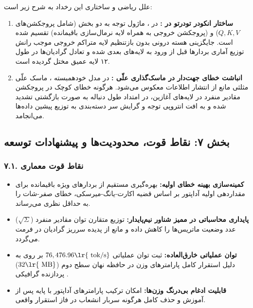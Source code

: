 علل ریاضی و ساختاری این رخداد به شرح زیر است:
\begin{enumerate}
    \item \textbf{ساختار انکودر تودرتو در :} در ، ماژول توجه به دو بخش  (شامل پروجکشن‌های $Q, K, V$) و  (پروجکشن خروجی به همراه لایه نرمال‌سازی باقیمانده) تقسیم شده است. جایگزینی هسته درونی بدون بازتنظیم لایه متراکم خروجی موجب رانش توزیع آماری بردارها  قبل از ورود به لایه‌های بعدی شده و تعادل گرادیان‌ها در طول ۱۲ لایه عمیق مختل گردیده است.
    \item \textbf{انباشت خطای جهت‌دار در ماسک‌گذاری علّی :} در مدل خودهمبسته ، ماسک علّی مثلثی مانع از انتشار اطلاعات معکوس می‌شود. هرگونه خطای کوچک در پروجکشن مقادیر منفرد در لایه‌های آغازین، در امتداد طول دنباله به صورت بازگشتی تشدید شده و به افت انتروپی توجه  و گرایش سر دسته‌بندی به توزیع پیشین داده‌ها می‌انجامد.
\end{enumerate}

\subsection*{بخش ۷: نقاط قوت، محدودیت‌ها و پیشنهادات توسعه }

\subsubsection*{۷.۱. نقاط قوت معماری }
\begin{itemize}
    \item \textbf{کمینه‌سازی بهینه خطای اولیه:} بهره‌گیری مستقیم از بردارهای ویژه باقیمانده برای مقداردهی اولیه آداپتور بر اساس قضیه اکارت-یانگ-میرسکی، خطای صفر-شات را به حداقل نظری می‌رساند.
    \item \textbf{پایداری محاسباتی در ممیز شناور نیم‌پایدار:} توزیع متقارن توان مقادیر منفرد ($\sqrt{\Sigma}$) عدد وضعیت ماتریس‌ها را کاهش داده و مانع از پدیده سرریز گرادیان در فرمت  می‌گردد.
    \item \textbf{توان عملیاتی خارق‌العاده:} ثبت توان عملیاتی $76,476.96 \text{\lr{ tok/s}}$ بر روی  به دلیل استقرار کامل پارامترهای وزن در حافظه نهان سطح دوم ($32 \text{\lr{ MB}}$) پردازنده گرافیکی .
    \item \textbf{قابلیت ادغام بی‌درنگ وزن‌ها:} امکان ترکیب پارامترهای آداپتور با پایه پس از آموزش و حذف کامل هرگونه سربار انشعاب در فاز استقرار واقعی.
\end{itemize}

